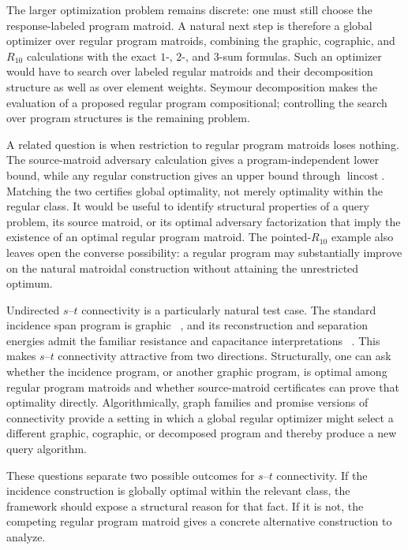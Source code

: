 \documentclass[11pt]{article}
\numberwithin{equation}{section}
\theoremstyle{remark}
\begin{document}
The larger optimization problem remains discrete: one must still choose the
response-labeled program matroid. A natural next step is therefore a global
optimizer over regular program matroids, combining the graphic, cographic,
and $R_{10}$ calculations with the exact $1$-, $2$-, and $3$-sum formulas.
Such an optimizer would have to search over labeled regular matroids and
their decomposition structure as well as over element weights. Seymour
decomposition makes the evaluation of a proposed regular program
compositional; controlling the search over program structures is the
remaining problem.

A related question is when restriction to regular program matroids loses
nothing. The source-matroid adversary calculation gives a program-independent
lower bound, while any regular construction gives an upper bound through
$\operatorname{lincost}$. Matching the two certifies global optimality, not
merely optimality within the regular class. It would be useful to identify
structural properties of a query problem, its source matroid, or its optimal
adversary factorization that imply the existence of an optimal regular
program matroid. The pointed-$R_{10}$ example also leaves open the converse
possibility: a regular program may substantially improve on the natural
matroidal construction without attaining the unrestricted optimum.

Undirected $s$--$t$ connectivity is a particularly natural test case.
The standard incidence span program is graphic
~\cite{KarchmerWigderson1993,BelovsReichardt2012}, and its reconstruction
and separation energies admit the familiar resistance and capacitance
interpretations
~\cite{JefferyKimmel2017,JarretJefferyKimmelPiedrafita2018}. This makes
$s$--$t$ connectivity attractive from two directions. Structurally, one can
ask whether the incidence program, or another graphic program, is optimal
among regular program matroids and whether source-matroid certificates can
prove that optimality directly. Algorithmically, graph families and promise
versions of connectivity provide a setting in which a global regular
optimizer might select a different graphic, cographic, or decomposed
program and thereby produce a new query algorithm.

These questions separate two possible outcomes for $s$--$t$ connectivity.
If the incidence construction is globally optimal within the relevant
class, the framework should expose a structural reason for that fact. If it
is not, the competing regular program matroid gives a concrete alternative
construction to analyze.
\end{document}
